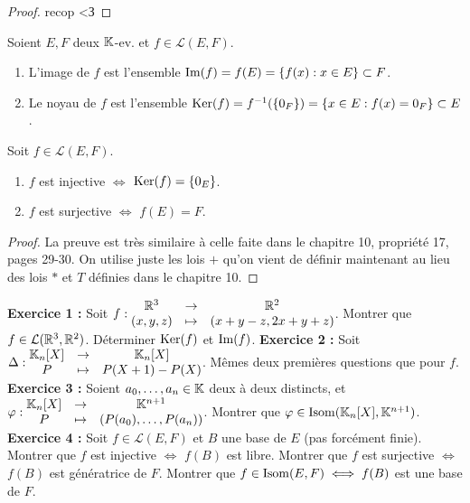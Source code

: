 \documentclass[12pt, a4paper]{report}
\begin{document}
\begin{proof}
    recop <З
\end{proof}

\begin{definition}
    Soient $E,F$ deux $\mathbb{K}$-ev. et $f \in \mathcal L(E,F)$.
    \begin{enumerate}
        \item L'image de $f$ est l'ensemble $\mathrm{Im}(f) = f(E) = \{f(x) : x \in E\} \subset F$.
        \item Le noyau de $f$ est l'ensemble $\mathrm{Ker}(f) = f^{-1}(\{0_F\}) = \{x \in E : f(x) = 0_F\} \subset E$.
    \end{enumerate}
\end{definition}

\begin{property}
    Soit $f \in \mathcal L(E,F)$.
    \begin{enumerate}
        \item $f$ est injective $\iff$ $\mathrm{Ker}(f) = \{0_E\}$.
        \item $f$ est surjective $\iff$ $f(E) = F$.
    \end{enumerate}
\end{property}

\begin{proof}
    La preuve est très similaire à celle faite dans le chapitre 10, propriété 17, pages 29-30. On utilise juste les lois $+$ qu'on vient de définir maintenant au lieu des lois $*$ et $T$ définies dans le chapitre 10.
\end{proof}

\begin{exercise}
    \begin{outline}
        \1 \textbf{Exercice 1 :} Soit $f: \begin{matrix}
        \mathbb{R}^3 &\to &\mathbb{R}^2\\
        (x,y,z) &\mapsto &(x+y-z, 2x+y+z)
        \end{matrix}$.
        \2 Montrer que $f \in \mathcal L(\mathbb{R}^3,\mathbb{R}^2)$.
        \2 Déterminer $\mathrm{Ker}(f)$ et $\mathrm{Im}(f)$.
        \1 \textbf{Exercice 2 :} Soit $\Delta : \begin{matrix}
        \mathbb{K}_n[X] &\to &\mathbb{K}_n[X]\\
        P &\mapsto &P(X+1) - P(X)
        \end{matrix}$.
        \2 Mêmes deux premières questions que pour $f$.
        \1 \textbf{Exercice 3 :} Soient $a_0,\dots,a_n \in \mathbb{K}$ deux à deux distincts, et $\varphi : \begin{matrix}
        \mathbb{K}_n[X] &\to &\mathbb{K}^{n+1}\\
        P &\mapsto &(P(a_0),\dots,P(a_n))
        \end{matrix}$.
        \2 Montrer que $\varphi \in \mathrm{Isom}(\mathbb{K}_n[X],\mathbb{K}^{n+1})$.
        \1 \textbf{Exercice 4 :} Soit $f \in \mathcal L(E,F)$ et $B$ une base de $E$ (pas forcément finie).
        \2 Montrer que $f$ est injective $\iff$ $f(B)$ est libre.
        \2 Montrer que $f$ est surjective $\iff$ $f(B)$ est génératrice de $F$.
        \2 Montrer que $f \in \mathrm{Isom}(E,F) \iff f(B)$ est une base de $F$.
    \end{outline}
\end{exercise}
\end{document}
